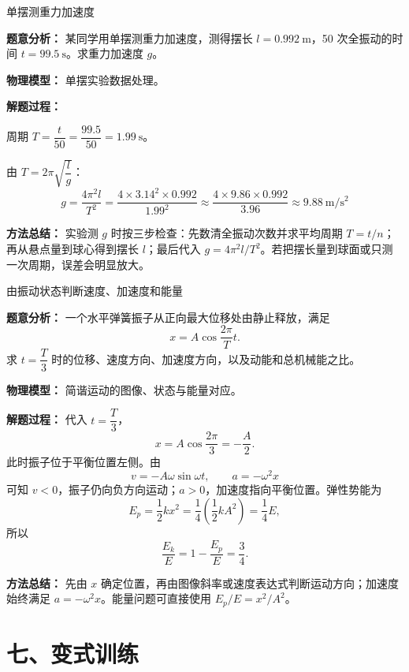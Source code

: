 \begin{examplebox}{单摆测重力加速度}

\textbf{题意分析：} 某同学用单摆测重力加速度，测得摆长 $l = 0.992\ \mathrm{m}$，50 次全振动的时间 $t = 99.5\ \mathrm{s}$。求重力加速度 $g$。

\textbf{物理模型：} 单摆实验数据处理。

\textbf{解题过程：}

周期 $T = \dfrac{t}{50} = \dfrac{99.5}{50} = 1.99\ \mathrm{s}$。

由 $T = 2\pi\sqrt{\dfrac{l}{g}}$：
\[
g = \frac{4\pi^2 l}{T^2} = \frac{4 \times 3.14^2 \times 0.992}{1.99^2} \approx \frac{4 \times 9.86 \times 0.992}{3.96} \approx 9.88\ \mathrm{m/s^2}
\]

\textbf{方法总结：} 实验测 $g$ 时按三步检查：先数清全振动次数并求平均周期 $T=t/n$；再从悬点量到球心得到摆长 $l$；最后代入 $g=4\pi^2l/T^2$。若把摆长量到球面或只测一次周期，误差会明显放大。

\end{examplebox}

\begin{examplebox}{由振动状态判断速度、加速度和能量}

\textbf{题意分析：} 一个水平弹簧振子从正向最大位移处由静止释放，满足
\[
x=A\cos\frac{2\pi}{T}t.
\]
求 $t=\dfrac{T}{3}$ 时的位移、速度方向、加速度方向，以及动能和总机械能之比。

\textbf{物理模型：} 简谐运动的图像、状态与能量对应。

\textbf{解题过程：} 代入 $t=\dfrac{T}{3}$，
\[
x=A\cos\frac{2\pi}{3}=-\frac{A}{2}.
\]
此时振子位于平衡位置左侧。由
\[
v=-A\omega\sin\omega t,\qquad a=-\omega^2x
\]
可知 $v<0$，振子仍向负方向运动；$a>0$，加速度指向平衡位置。弹性势能为
\[
E_p=\frac12kx^2
   =\frac14\left(\frac12kA^2\right)
   =\frac14E,
\]
所以
\[
\boxed{\frac{E_k}{E}=1-\frac{E_p}{E}=\frac34}.
\]

\textbf{方法总结：} 先由 $x$ 确定位置，再由图像斜率或速度表达式判断运动方向；加速度始终满足 $a=-\omega^2x$。能量问题可直接使用 $E_p/E=x^2/A^2$。

\end{examplebox}

\section*{七、变式训练}

